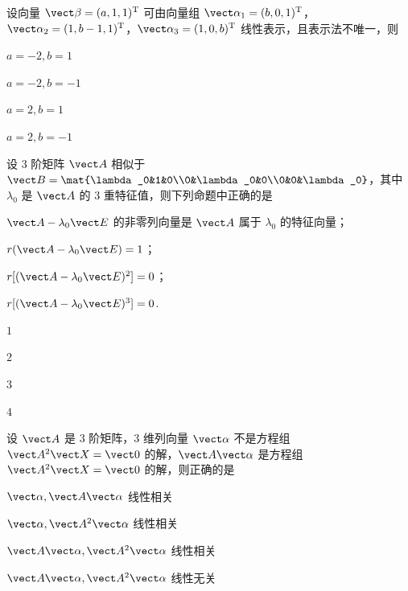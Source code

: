 \begin{question}[index=5]
设向量 $\vect\beta=(a,1,1)^{\mathrm T}$ 可由向量组 $\vect\alpha_1=(b,0,1)^{\mathrm T}$，$\vect\alpha_2=(1,b-1,1)^{\mathrm T}$，$\vect\alpha_3=(1,0,b)^{\mathrm T}$ 线性表示，且表示法不唯一，则
\begin{choices}[columns=4]
\item $a=-2,b=1$
\item $a=-2,b=-1$
\item $a=2,b=1$
\item $a=2,b=-1$
\end{choices}
\end{question}
\QuestionBreak

\begin{question}[index=6]
设 $3$ 阶矩阵 $\vect A$ 相似于 $\vect B=\mat{\lambda_0&1&0\\0&\lambda_0&0\\0&0&\lambda_0}$，其中 $\lambda_0$ 是 $\vect A$ 的 $3$ 重特征值，则下列命题中正确的是
\par{} $\vect A-\lambda_0\vect E$ 的非零列向量是 $\vect A$ 属于 $\lambda_0$ 的特征向量；
\par{} $r(\vect A-\lambda_0\vect E)=1$；
\par{} $r[(\vect A-\lambda_0\vect E)^2]=0$；
\par{} $r[(\vect A-\lambda_0\vect E)^3]=0$.
\begin{choices}[columns=4]
\item $1$
\item $2$
\item $3$
\item $4$
\end{choices}
\end{question}
\QuestionBreak

\begin{question}[index=7]
设 $\vect A$ 是 $3$ 阶矩阵，$3$ 维列向量 $\vect\alpha$ 不是方程组 $\vect A^2\vect X=\vect0$ 的解，$\vect A\vect\alpha$ 是方程组 $\vect A^2\vect X=\vect0$ 的解，则正确的是
\begin{choices}[columns=2]
\item $\vect\alpha,\vect A\vect\alpha$ 线性相关
\item $\vect\alpha,\vect A^2\vect\alpha$ 线性相关
\item $\vect A\vect\alpha,\vect A^2\vect\alpha$ 线性相关
\item $\vect A\vect\alpha,\vect A^2\vect\alpha$ 线性无关
\end{choices}
\end{question}
\QuestionBreak

